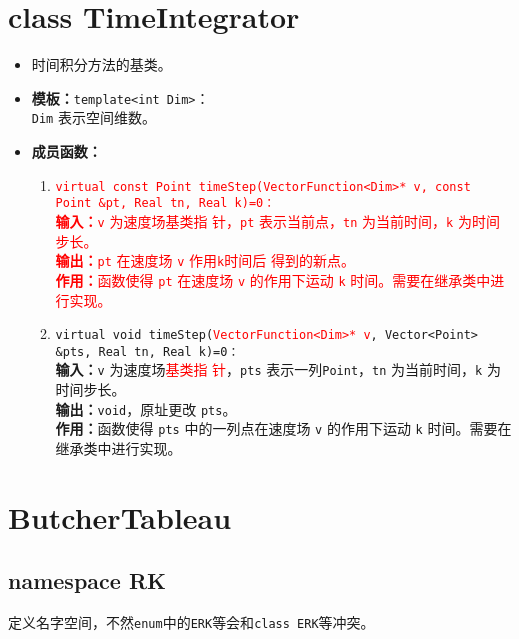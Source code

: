 \documentclass[a4paper,twoside]{ctexart}
\begin{document}
\section{class TimeIntegrator}
\begin{itemize}
    \item 时间积分方法的基类。
    \item \textbf{模板：}\texttt{template<int Dim>}：\\\texttt{Dim} 表示空间维数。
    \item \textbf{成员函数：}
      \begin{enumerate}[(1)]
       \item \textcolor{red}{
           \texttt{virtual const Point timeStep(VectorFunction<Dim>* v,
            const Point \&pt, Real tn, Real k)=0：}\\
          \textbf{输入：}\texttt{v} 为速度场\textcolor{red}{基类指
                  针}，\texttt{pt} 表示当前点，\texttt{tn} 为当前时间，\texttt{k} 为时间步长。\\
                \textbf{输出：}\texttt{pt} 在速度场 \texttt{v} 作用\texttt{k}时间后
                得到的新点。\\
                \textbf{作用：}函数使得 \texttt{pt} 在速度场 \texttt{v} 的作用下运动 \texttt{k} 时间。需要在继承类中进行实现。
          }
                \item \texttt{virtual void timeStep(}\textcolor{red}{\texttt{VectorFunction<Dim>* v}}\texttt{, Vector<Point> \&pts, Real tn, Real k)=0：}\\
                \textbf{输入：}\texttt{v} 为速度场\textcolor{red}{基类指
                  针}，\texttt{pts} 表示一列\texttt{Point}，\texttt{tn} 为当前时间，\texttt{k} 为时间步长。\\
                \textbf{输出：}\texttt{void}，原址更改 \texttt{pts}。\\
                \textbf{作用：}函数使得 \texttt{pts} 中的一列点在速度场 \texttt{v} 的作用下运动 \texttt{k} 时间。需要在继承类中进行实现。
            \end{enumerate}
\end{itemize}

\section{ButcherTableau}
\subsection{namespace RK}
定义名字空间，不然\texttt{enum}中的\texttt{ERK}等会和\texttt{class ERK}等冲突。
\end{document}
